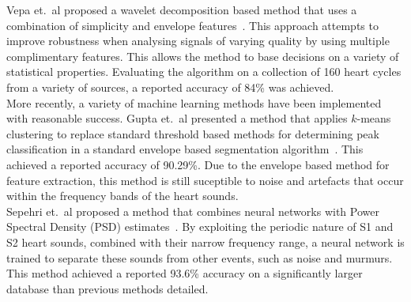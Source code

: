 \documentclass[titlepage, 12pt]{scrartcl} \usepackage{enumitem}
\begin{document}
Vepa et.\ al proposed a wavelet decomposition based method that uses a
combination of simplicity and envelope features~\parencite{Vepa2008}. This
approach attempts to improve robustness when analysing signals of varying
quality by using multiple complimentary features. This allows the method to base
decisions on a variety of statistical properties. Evaluating the algorithm on a
collection of 160 heart cycles from a variety of sources, a reported accuracy
of 84\% was achieved.\\

More recently, a variety of machine learning methods have been implemented with reasonable
success. Gupta et.\ al presented a method that applies $k$-means clustering to
replace standard threshold based methods for determining peak classification in
a standard envelope based segmentation algorithm~\parencite{Gupta2007}. This achieved a reported
accuracy of 90.29\%. Due to the envelope based method for feature extraction,
this method is still suceptible to noise and artefacts that occur within the
frequency bands of the heart sounds.\\

Sepehri et.\ al proposed a method that combines neural networks with Power
Spectral Density (PSD) estimates~\parencite{Sepehri2010}.  By exploiting the
periodic nature of S1 and S2 heart sounds, combined with their narrow frequency
range, a neural network is trained to separate these sounds from other events,
such as noise and murmurs. This method achieved a reported 93.6\% accuracy on a
significantly larger database than previous methods detailed.\\
\end{document}
